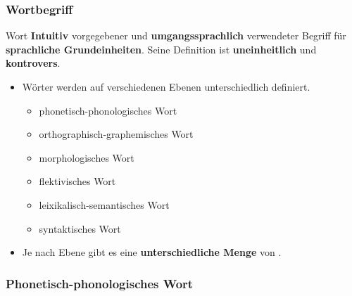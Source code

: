 \begin{frame}
\frametitle{Wortbegriff}

\begin{block}{Wort}
\textbf{Intuitiv} vorgegebener und \textbf{umgangssprachlich} verwendeter
Begriff für \textbf{sprachliche Grundeinheiten}. Seine Definition ist
\textbf{uneinheitlich} und \textbf{kontrovers}. \citep[vgl.][]{Bussmann2002a, Glueck&Roedel16a}
\end{block}

\pause 

\begin{itemize}
	\item Wörter werden auf verschiedenen Ebenen unterschiedlich definiert.
	
	\begin{itemize}
		\item phonetisch-phonologisches Wort
		\item orthographisch-graphemisches Wort
		\item morphologisches Wort
		\item flektivisches Wort
		\item leixikalisch-semantisches Wort
		\item syntaktisches Wort
	\end{itemize}

\item Je nach Ebene gibt es eine \textbf{unterschiedliche Menge} von .
\end{itemize}

\end{frame}


\subsubsection{Phonetisch-phonologisches Wort}


